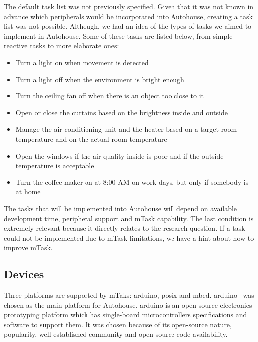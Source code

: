 The default task list was not previously specified. Given that it was not known in advance which peripherals would be incorporated into Autohouse, creating a task list was not possible. Although, we had an idea of the types of tasks we aimed to implement in Autohouse. Some of these tasks are listed below, from simple reactive tasks to more elaborate ones:

\begin{itemize}
    \item Turn a light on when movement is detected
    \item Turn a light off when the environment is bright enough
    \item Turn the ceiling fan off when there is an object too close to it
    \item Open or close the curtains based on the brightness inside and outside
    \item Manage the air conditioning unit and the heater based on a target room temperature and on the actual room temperature
    \item Open the windows if the air quality inside is poor and if the outside temperature is acceptable
    \item Turn the coffee maker on at 8:00 AM on work days, but only if somebody is at home
\end{itemize}

The tasks that will be implemented into Autohouse will depend on available development time, peripheral support and \gls{mTask} capability. The last condition is extremely relevant because it directly relates to the research question. If a task could not be implemented due to \gls{mTask} limitations, we have a hint about how to improve \gls{mTask}.

\subsection{Devices}\label{sec:autohouse_devices}

Three platforms are supported by mTaks: \gls{arduino}, \acs{posix} and \gls{mbed}. \gls{arduino}~\cite{arduino} was chosen as the main platform for Autohouse. \gls{arduino} is an open-source electronics prototyping platform which has single-board microcontrollers specifications and software to support them. It was chosen because of its open-source nature, popularity, well-established community and open-source code availability.

